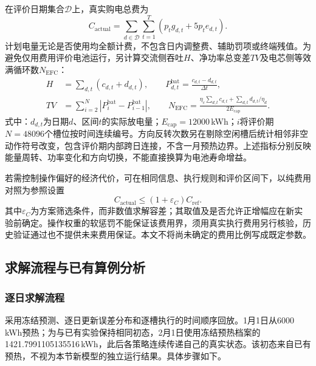 在评价日期集合$\mathcal D$上，真实购电总费为
\begin{equation}\label{eq:q2-actual-cost}
 C_{\mathrm{actual}}=\sum_{d\in\mathcal D}\sum_{t=1}^{T}
 \left(p_tg_{d,t}+5p_te_{d,t}\right).
\end{equation}
计划电量无论是否使用均全额计费，不包含日内调整费、辅助罚项或终端残值。为避免仅用费用评价电池运行，另计算交流侧吞吐$H$、净功率总变差$TV$及电芯侧等效满循环数$N_{\mathrm{EFC}}$：
\begin{equation}\label{eq:q2-battery-metrics}
 \begin{aligned}
 H&=\sum_{d,t}(c_{d,t}+d_{d,t}),\qquad
 P_{d,t}^{\mathrm{bat}}=\frac{c_{d,t}-d_{d,t}}{\Delta t},\\
 TV&=\sum_{i=2}^{N}|P_i^{\mathrm{bat}}-P_{i-1}^{\mathrm{bat}}|,\qquad
 N_{\mathrm{EFC}}=\frac{\eta_c\sum_{d,t}c_{d,t}+\sum_{d,t}d_{d,t}/\eta_d}{2E_{\mathrm{cap}}}.
 \end{aligned}
\end{equation}
式中：$d_{d,t}$为日期$d$、区间$t$的实际放电量；$E_{\mathrm{cap}}=12000$\,kWh；$i$将评价期$N=48096$个槽位按时间连续编号。方向反转次数另在剔除空闲槽后统计相邻非空动作符号改变，包含评价期内部跨日连接，不含一月预热边界。上述指标分别反映能量周转、功率变化和方向切换，不能直接换算为电池寿命增益。

若需控制操作偏好的经济代价，可在相同信息、执行规则和评价区间下，以纯费用对照为参照设置
\begin{equation}\label{eq:q2-cost-budget}
 C_{\mathrm{actual}}\le(1+\varepsilon_C)C_{\mathrm{ref}}.
\end{equation}
其中$\varepsilon_C$为方案筛选条件，而非数值求解容差；其取值及是否允许正增幅应在新实验前确定。操作权重的软惩罚不能保证该费用界，须用真实执行费用另行核验，历史验证通过也不提供未来费用保证。本文不将尚未确定的费用比例写成既定参数。

\subsection{求解流程与已有算例分析}
\subsubsection{逐日求解流程}

采用冻结预测、逐日更新误差分布和逐槽执行的时间顺序回放。1月1日从6000\,kWh预热；为与已有实验保持相同初态，2月1日使用冻结预热档案的1421.7991105135516\,kWh，此后各策略连续传递自己的真实状态。该初态来自已有预热，不视为本节新模型的独立运行结果。具体步骤如下。

